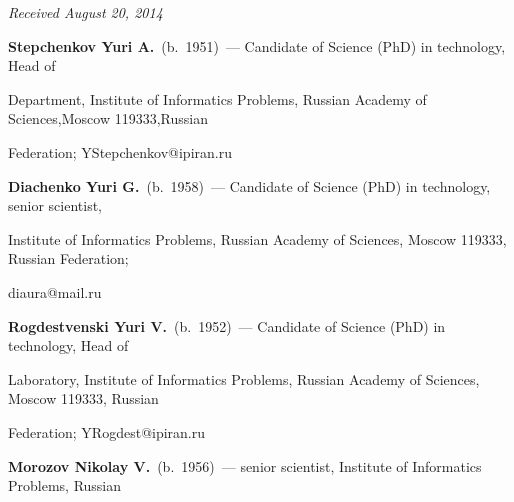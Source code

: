 










\hfill{\small\textit{Received August 20, 2014}}






\Contr



\noindent

\textbf{Stepchenkov Yuri A.}\ (b.\ 1951)~--- Candidate of Science (PhD) in technology, Head of

Department, Institute of Informatics Problems, Russian Academy of Sciences,Moscow 119333,Russian

Federation; YStepchenkov@ipiran.ru



\vspace*{3pt}



\noindent

\textbf{Diachenko Yuri G.}\ (b.\ 1958)~--- Candidate of Science (PhD) in technology, senior scientist,

Institute of Informatics Problems, Russian Academy of Sciences, Moscow 119333, Russian Federation;

diaura@mail.ru



\vspace*{3pt}



\noindent

\textbf{Rogdestvenski Yuri V.}\ (b.\ 1952)~--- Candidate of Science (PhD) in technology, Head of

Laboratory, Institute of Informatics Problems, Russian Academy of Sciences, Moscow 119333, Russian

Federation; YRogdest@ipiran.ru



\vspace*{3pt}



\noindent

\textbf{Morozov Nikolay V.}\ (b.\ 1956)~--- senior scientist, Institute of Informatics Problems, Russian

